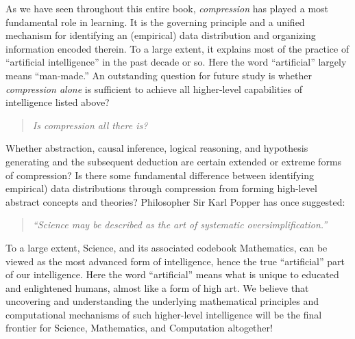 \documentclass[../../book-main.tex]{subfiles}
\begin{document}
As we have seen throughout this entire book, {\em compression} has played a most fundamental role in learning. It is the governing principle and a unified mechanism for identifying an (empirical) data distribution and organizing information encoded therein. To a large extent, it explains most of the practice of ``artificial intelligence'' in the past decade or so. Here the word ``artificial'' largely means ``man-made.'' An outstanding question for future study is whether {\em compression alone} is sufficient to achieve all higher-level capabilities of intelligence listed above? 
\begin{quote}
\begin{center}
        {\em Is compression all there is?}
\end{center}
\end{quote}
Whether abstraction, causal inference, logical reasoning, and hypothesis generating and the subsequent deduction are certain extended or extreme forms of compression? Is there some fundamental difference between identifying  empirical) data distributions through compression from forming high-level abstract concepts and theories? Philosopher Sir Karl Popper has once suggested:
\begin{quote}
    \begin{center}
    {\em ``Science may be described as the art of systematic oversimplification.''}
    \end{center}
\end{quote}
To a large extent, Science, and its associated codebook Mathematics, can be viewed as the most advanced form of intelligence, hence the true ``artificial'' part of our intelligence. Here the word ``artificial'' means what is unique to educated and enlightened humans, almost like a form of high art. We believe that uncovering and understanding the underlying mathematical principles and computational mechanisms of such higher-level intelligence will be the final frontier for Science, Mathematics, and Computation altogether!
\end{document}
